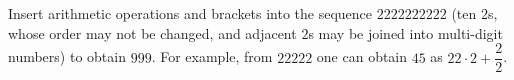 Insert arithmetic operations and brackets into the sequence $2222222222$ (ten $2$s, whose order may not be changed, and adjacent $2$s may be joined into multi-digit numbers) to obtain $999$. For example, from $22222$ one can obtain $45$ as $22\cdot2+\dfrac22$.
